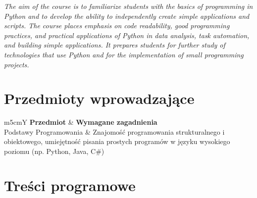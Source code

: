 \documentclass[12pt, a4paper]{article}
\newcommand{\thdrule}{\noalign{\global\setlength{\extrarowheight}{0pt}}}
\newcommand{\thdend}{\noalign{\global\setlength{\extrarowheight}{3pt}}}
\begin{document}
\textit{The aim of the course is to familiarize students with the basics of programming in Python and to develop the ability to independently create simple applications and scripts. The course places emphasis on code readability, good programming practices, and practical applications of Python in data analysis, task automation, and building simple applications. It prepares students for further study of technologies that use Python and for the implementation of small programming projects.}


\section{Przedmioty wprowadzające}

{\scriptsize
\begin{tabularx}{\textwidth}{m{5cm}Y}
\thdrule\toprule
{} {\color{white}\textbf{Przedmiot}} & {\color{white}\textbf{Wymagane zagadnienia}} \\
\midrule\thdend
   Podstawy Programowania & Znajomość programowania strukturalnego i obiektowego, umiejętność pisania prostych programów w języku wysokiego poziomu (np. Python, Java, C\#) \\
\bottomrule
\end{tabularx}}

\section{Treści programowe}
\end{document}
